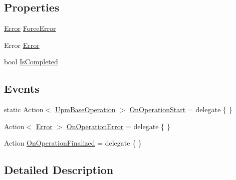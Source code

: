 \subsection*{Properties}
\begin{DoxyCompactItemize}
\item 
\mbox{\hyperlink{class_unity_editor_1_1_package_manager_1_1_u_i_1_1_upm_base_operation_a116dcc466d587905084e826b47f7e05b}{Error}} \mbox{\hyperlink{class_unity_editor_1_1_package_manager_1_1_u_i_1_1_upm_base_operation_a5d5284c292d559bf9d79f612d58a674c}{Force\+Error}}
\item 
Error \mbox{\hyperlink{class_unity_editor_1_1_package_manager_1_1_u_i_1_1_upm_base_operation_a116dcc466d587905084e826b47f7e05b}{Error}}
\item 
bool \mbox{\hyperlink{class_unity_editor_1_1_package_manager_1_1_u_i_1_1_upm_base_operation_a0541fe1457f933977b2c3c3b13c504af}{Is\+Completed}}
\end{DoxyCompactItemize}
\subsection*{Events}
\begin{DoxyCompactItemize}
\item 
static Action$<$ \mbox{\hyperlink{class_unity_editor_1_1_package_manager_1_1_u_i_1_1_upm_base_operation}{Upm\+Base\+Operation}} $>$ \mbox{\hyperlink{class_unity_editor_1_1_package_manager_1_1_u_i_1_1_upm_base_operation_a7d5501ef1cff8562b55b86b29ddd91b9}{On\+Operation\+Start}} = delegate \{ \}
\item 
Action$<$ \mbox{\hyperlink{class_unity_editor_1_1_package_manager_1_1_u_i_1_1_upm_base_operation_a116dcc466d587905084e826b47f7e05b}{Error}} $>$ \mbox{\hyperlink{class_unity_editor_1_1_package_manager_1_1_u_i_1_1_upm_base_operation_af1ff89f0295369d7a9ae7e0987451b1d}{On\+Operation\+Error}} = delegate \{ \}
\item 
Action \mbox{\hyperlink{class_unity_editor_1_1_package_manager_1_1_u_i_1_1_upm_base_operation_a29672fd8715a0084d008dc9ec89f17b3}{On\+Operation\+Finalized}} = delegate \{ \}
\end{DoxyCompactItemize}


\subsection{Detailed Description}


